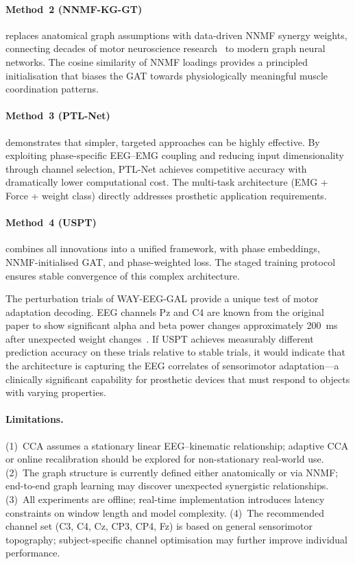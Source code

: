 \documentclass[12pt, a4paper]{article}
\begin{document}
	\paragraph{Method~2 (NNMF-KG-GT)} replaces anatomical graph assumptions
	with data-driven NNMF synergy weights, connecting decades of motor
	neuroscience research~\cite{tresch2006, pierella2020} to modern
	graph neural networks. The cosine similarity of NNMF loadings provides
	a principled initialisation that biases the GAT towards physiologically
	meaningful muscle coordination patterns.
	
	\paragraph{Method~3 (PTL-Net)} demonstrates that simpler, targeted
	approaches can be highly effective. By exploiting phase-specific
	EEG--EMG coupling and reducing input dimensionality through channel
	selection, PTL-Net achieves competitive accuracy with dramatically lower
	computational cost. The multi-task architecture (EMG + Force + weight
	class) directly addresses prosthetic application requirements.
	
	\paragraph{Method~4 (USPT)} combines all innovations into a unified
	framework, with phase embeddings, NNMF-initialised GAT, and
	phase-weighted loss. The staged training protocol ensures stable
	convergence of this complex architecture.
	
	The perturbation trials of WAY-EEG-GAL provide a unique test of motor
	adaptation decoding. EEG channels Pz and C4 are known from the original
	paper to show significant alpha and beta power changes approximately 200~ms
	after unexpected weight changes~\cite{luciw2014}. If USPT achieves
	measurably different prediction accuracy on these trials relative to stable
	trials, it would indicate that the architecture is capturing the EEG correlates
	of sensorimotor adaptation---a clinically significant capability for prosthetic
	devices that must respond to objects with varying properties.
	
	\paragraph{Limitations.}
	(1)~CCA assumes a stationary linear EEG--kinematic relationship; adaptive CCA
	or online recalibration should be explored for non-stationary real-world use.
	(2)~The graph structure is currently defined either anatomically or via NNMF;
	end-to-end graph learning may discover unexpected synergistic relationships.
	(3)~All experiments are offline; real-time implementation introduces latency
	constraints on window length and model complexity.
	(4)~The recommended channel set (C3, C4, Cz, CP3, CP4, Fz) is based on
	general sensorimotor topography; subject-specific channel optimisation may
	further improve individual performance.
	
\end{document}
